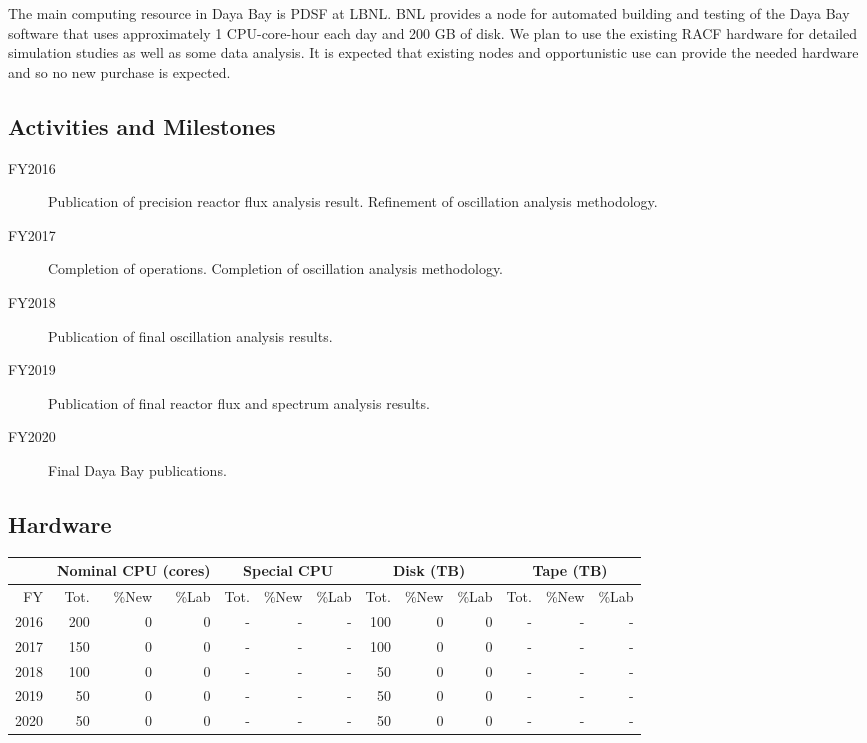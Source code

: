 \documentclass[pdftex,12pt,letter]{article}
\begin{document}
The main computing resource in Daya Bay is PDSF at LBNL. BNL provides
a node for automated building and testing of the Daya Bay software
that uses approximately 1 CPU-core-hour each day and 200 GB of disk.
We plan to use the existing RACF hardware for detailed simulation
studies as well as some data analysis.  
It is expected that existing nodes and opportunistic use can provide
the needed hardware and so no new purchase is expected.


\subsection{Activities and Milestones}

\begin{description}
\item[FY2016] Publication of precision reactor flux analysis result. 
				Refinement of oscillation analysis methodology. 
\item[FY2017] Completion of operations. Completion of oscillation analysis methodology. 
\item[FY2018] Publication of final oscillation analysis results.
\item[FY2019] Publication of final reactor flux and spectrum analysis results.
\item[FY2020] Final Daya Bay publications.
\end{description}

\subsection{Hardware}

\begin{tabular}[h]{|r || r|r|r || r|r|r || r|r|r || r|r|r ||}
  \hline
   & \multicolumn{3}{c||}{Nominal CPU (cores)} & \multicolumn{3}{c||}{Special CPU} & \multicolumn{3}{c||}{Disk (TB)} & \multicolumn{3}{c||}{Tape (TB)} \\
   \hline
  FY & Tot. & \%New & \%Lab & Tot. & \%New & \%Lab & Tot. & \%New & \%Lab & Tot. & \%New & \%Lab \\
  \hline
  2016 & 200& 0& 0& -& -& -& 100& 0 & 0 & -& -& -\\
  \hline
  2017 & 150& 0& 0& -& -& -& 100& 0 & 0 & -& -& - \\
  \hline
  2018 & 100& 0& 0& -& -& -& 50& 0 & 0 & -& -& - \\
  \hline
  2019 & 50& 0& 0& -& -& -& 50& 0 & 0 & -& -& - \\
  \hline
 2020 & 50& 0& 0& -& -& -& 50& 0& 0& -& -& - \\
  \hline
\end{tabular}
\end{document}
